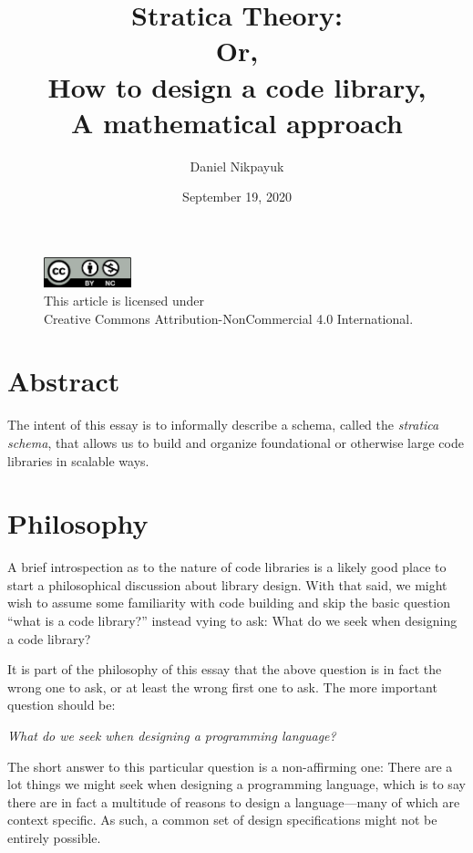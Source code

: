 \documentclass[twoside]{article}
\title{Stratica Theory:\\[1em]Or,\\How to design a code library,\\A mathematical approach}
\author{Daniel Nikpayuk}
\date{September 19, 2020}
\begin{document}
\maketitle
\thispagestyle{empty}

\begin{figure}[h]
\centering
\includegraphics[width=1in]{../cc-by-nc.png}\\[0.1in]
\tiny This article is licensed under \\
Creative Commons Attribution-NonCommercial 4.0 International.\\[0.3in]
\end{figure}

\section*{Abstract}

The intent of this essay is to informally describe a schema, called the \emph{stratica schema},
that allows us to build and organize foundational or otherwise large code libraries in scalable ways.

\section*{Philosophy}

A brief introspection as to the nature of code libraries is a likely good place to start a philosophical discussion
about library design. With that said, we might wish to assume some familiarity with code building and skip the basic
question ``what is a code library?'' instead vying to ask: What do we seek when designing a code library?

It is part of the philosophy of this essay that the above question is in fact the wrong one to ask, or at least
the wrong first one to ask. The more important question should be:
\begin{center}
\emph{What do we seek when designing a programming language?}
\end{center}

The short answer to this particular question is a non-affirming one: There are a lot things we might seek when designing
a programming language, which is to say there are in fact a multitude of reasons to design a language---many
of which are context specific. As such, a common set of design specifications might not be entirely possible.
\end{document}

